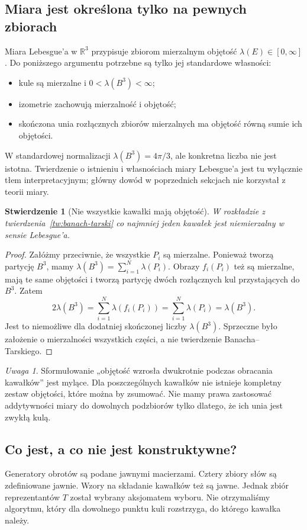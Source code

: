 \documentclass[11pt,a4paper]{article}
\numberwithin{equation}{section}
\theoremstyle{plain}
\newtheorem{stwierdzenie}[twierdzenie]{Stwierdzenie}
\theoremstyle{definition}
\theoremstyle{remark}
\newtheorem{uwaga}[twierdzenie]{Uwaga}
\newcommand{\R}{\mathbb R}
\begin{document}
\subsection{Miara jest określona tylko na pewnych zbiorach}
Miara Lebesgue'a w $\R^3$ przypisuje zbiorom mierzalnym objętość $\lambda(E)\in[0,\infty]$. Do poniższego argumentu potrzebne są tylko jej standardowe własności:
\begin{itemize}
\item kule są mierzalne i $0<\lambda(B^3)<\infty$;
\item izometrie zachowują mierzalność i objętość;
\item skończona unia rozłącznych zbiorów mierzalnych ma objętość równą sumie ich objętości.
\end{itemize}
W standardowej normalizacji $\lambda(B^3)=4\pi/3$, ale konkretna liczba nie jest istotna. Twierdzenie o istnieniu i własnościach miary Lebesgue'a jest tu wyłącznie tłem interpretacyjnym; główny dowód w poprzednich sekcjach nie korzystał z teorii miary.
\begin{stwierdzenie}[Nie wszystkie kawałki mają objętość]\label{st:niemierzalnosc}
W rozkładzie z twierdzenia~\ref{tw:banach-tarski} co najmniej jeden kawałek jest niemierzalny w sensie Lebesgue'a.
\end{stwierdzenie}
\begin{proof}
Załóżmy przeciwnie, że wszystkie $P_i$ są mierzalne. Ponieważ tworzą partycję $B^3$, mamy $\lambda(B^3)=\sum_{i=1}^{N}\lambda(P_i)$. Obrazy $f_i(P_i)$ też są mierzalne, mają te same objętości i tworzą partycję dwóch rozłącznych kul przystających do $B^3$. Zatem
\[
 2\lambda(B^3)=\sum_{i=1}^{N}\lambda(f_i(P_i))=
 \sum_{i=1}^{N}\lambda(P_i)=\lambda(B^3).
\]
Jest to niemożliwe dla dodatniej skończonej liczby $\lambda(B^3)$. Sprzeczne było założenie o mierzalności wszystkich części, a nie twierdzenie Banacha--Tarskiego.
\end{proof}
\begin{uwaga}
Sformułowanie „objętość wzrosła dwukrotnie podczas obracania kawałków” jest mylące. Dla poszczególnych kawałków nie istnieje kompletny zestaw objętości, które można by zsumować. Nie mamy prawa zastosować addytywności miary do dowolnych podzbiorów tylko dlatego, że ich unia jest zwykłą kulą.
\end{uwaga}

\subsection{Co jest, a co nie jest konstruktywne?}
Generatory obrotów są podane jawnymi macierzami. Cztery zbiory słów są zdefiniowane jawnie. Wzory na składanie kawałków też są jawne. Jednak zbiór reprezentantów $T$ został wybrany aksjomatem wyboru. Nie otrzymaliśmy algorytmu, który dla dowolnego punktu kuli rozstrzyga, do którego kawałka należy.
\end{document}
